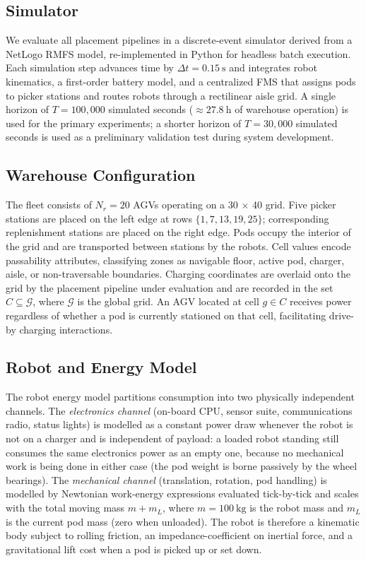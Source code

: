 \documentclass[conference]{IEEEtran}
\begin{document}
\subsection{Simulator}
We evaluate all placement pipelines in a discrete-event simulator derived from a NetLogo RMFS model, re-implemented in Python for headless batch execution. Each simulation step advances time by $\Delta t = \SI{0.15}{\second}$ and integrates robot kinematics, a first-order battery model, and a centralized FMS that assigns pods to picker stations and routes robots through a rectilinear aisle grid. A single horizon of $T = 100{,}000$ simulated seconds ($\approx\SI{27.8}{\hour}$ of warehouse operation) is used for the primary experiments; a shorter horizon of $T = 30{,}000$ simulated seconds is used as a preliminary validation test during system development.

\subsection{Warehouse Configuration}
The fleet consists of $N_r = 20$ AGVs operating on a \SI{30}{\cell} $\times$ \SI{40}{\cell} grid. Five picker stations are placed on the left edge at rows $\{1, 7, 13, 19, 25\}$; corresponding replenishment stations are placed on the right edge. Pods occupy the interior of the grid and are transported between stations by the robots. Cell values encode passability attributes, classifying zones as navigable floor, active pod, charger, aisle, or non-traversable boundaries. Charging coordinates are overlaid onto the grid by the placement pipeline under evaluation and are recorded in the set $C \subseteq \mathcal{G}$, where $\mathcal{G}$ is the global grid. An AGV located at cell $g \in C$ receives power regardless of whether a pod is currently stationed on that cell, facilitating drive-by charging interactions.

\subsection{Robot and Energy Model}
\label{sec:energy_model}

The robot energy model partitions consumption into two physically independent channels. The \emph{electronics channel} (on-board CPU, sensor suite, communications radio, status lights) is modelled as a constant power draw whenever the robot is not on a charger and is independent of payload: a loaded robot standing still consumes the same electronics power as an empty one, because no mechanical work is being done in either case (the pod weight is borne passively by the wheel bearings). The \emph{mechanical channel} (translation, rotation, pod handling) is modelled by Newtonian work-energy expressions evaluated tick-by-tick and scales with the total moving mass $m + m_L$, where $m = \SI{100}{\kilo\gram}$ is the robot mass and $m_L$ is the current pod mass (zero when unloaded). The robot is therefore a kinematic body subject to rolling friction, an impedance-coefficient on inertial force, and a gravitational lift cost when a pod is picked up or set down.
\end{document}
